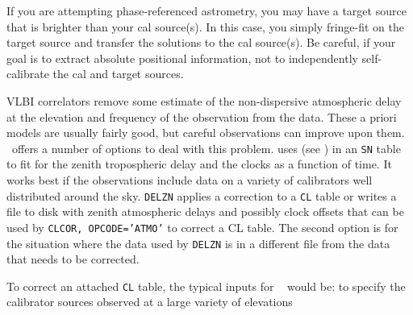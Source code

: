 If you are attempting phase-referenced astrometry, you may have a
target source that is brighter than your cal source(s).  In this case,
you simply fringe-fit on the target source and transfer the solutions
to the cal source(s).  Be careful, if your goal is to extract absolute
positional information, not to independently self-calibrate the cal
and target sources.


VLBI correlators remove some estimate of the non-dispersive
atmospheric delay at the elevation and frequency of the observation
from the data.  These a priori models are usually fairly good, but
careful observations can improve upon them.
\AIPS\ offers a number of options to deal with this
problem.  {\tt {}} uses  (see
) in an {\tt SN} table to fit for the zenith tropospheric
delay and  the clocks as a function of time. It works best if the
observations include data on a variety of calibrators well distributed
around the sky.  {\tt DELZN} applies a correction to a {\tt CL} table
or writes a file to disk with zenith atmospheric delays and possibly
clock offsets that can be used by {\tt CLCOR, OPCODE='ATMO'} to
correct a CL table.  The second option is for the situation where the
data used by {\tt DELZN} is in a different file from the data that
needs to be corrected.

To correct an attached {\tt CL} table, the typical inputs for {\tt
{}} would be:
{to specify the calibrator sources observed at a large variety of elevations}

